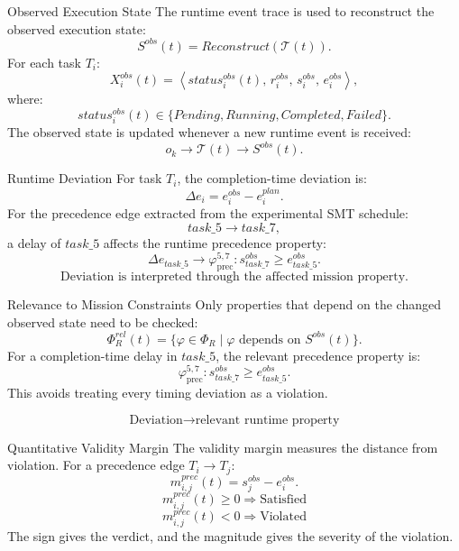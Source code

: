 \documentclass[aspectratio=169]{beamer}
\begin{document}
\begin{frame}{Observed Execution State}
The runtime event trace is used to reconstruct the observed execution state:
\[
\boxed{S^{obs}(t)=Reconstruct(\mathcal{T}(t))}.
\]
For each task $T_i$:
\[
X_i^{obs}(t)
=
\left\langle
status_i^{obs}(t),\,
r_i^{obs},\,
s_i^{obs},\,
e_i^{obs}
\right\rangle,
\]
where:
\[
status_i^{obs}(t)\in\{Pending,Running,Completed,Failed\}.
\]
The observed state is updated whenever a new runtime event is received:
\[
\boxed{o_k\rightarrow\mathcal{T}(t)\rightarrow S^{obs}(t)}.
\]
\end{frame}

\begin{frame}{Runtime Deviation}
For task $T_i$, the completion-time deviation is:
\[
\Delta e_i=e_i^{obs}-e_i^{plan}.
\]
For the precedence edge extracted from the experimental SMT schedule:
\[
task\_5 \rightarrow task\_7,
\]
a delay of $task\_5$ affects the runtime precedence property:
\[
\Delta e_{task\_5}
\rightarrow
\varphi^{5,7}_{\mathrm{prec}}:
s^{obs}_{task\_7}\geq e^{obs}_{task\_5}.
\]
\[
\boxed{\text{Deviation is interpreted through the affected mission property.}}
\]
\end{frame}

\begin{frame}{Relevance to Mission Constraints}
Only properties that depend on the changed observed state need to be checked:
\[
\Phi_R^{rel}(t)
=
\{\varphi\in\Phi_R\mid \varphi \text{ depends on } S^{obs}(t)\}.
\]
For a completion-time delay in $task\_5$, the relevant precedence property is:
\[
\varphi^{5,7}_{\mathrm{prec}}:
s^{obs}_{task\_7}\geq e^{obs}_{task\_5}.
\]
This avoids treating every timing deviation as a violation.

\[
\boxed{\text{Deviation}\rightarrow\text{relevant runtime property}}
\]
\end{frame}

\begin{frame}{Quantitative Validity Margin}
The validity margin measures the distance from violation.
For a precedence edge $T_i\rightarrow T_j$:
\[
m^{prec}_{i,j}(t)=s^{obs}_{j}-e^{obs}_{i}.
\]
\[
m^{prec}_{i,j}(t)\geq 0
\Rightarrow
\text{Satisfied}
\]
\[
m^{prec}_{i,j}(t)<0
\Rightarrow
\text{Violated}
\]
The sign gives the verdict, and the magnitude gives the severity of the violation.
\end{frame}
\end{document}

